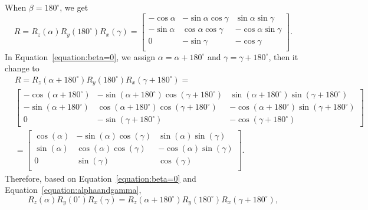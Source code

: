 When $\beta=180^{\circ}$, we get
\begin{equation}
\label{equation:beta=180}
R=R_{z}(\alpha)R_{y}(180^{\circ})R_{x}(\gamma)=
\begin{bmatrix}
-\cos\alpha&-\sin\alpha\cos\gamma&\sin\alpha\sin\gamma\\
-\sin\alpha&\cos\alpha\cos\gamma&-\cos\alpha\sin\gamma\\
0&                               -\sin\gamma&-\cos\gamma\\
\end{bmatrix}.
\end{equation}
In Equation~\ref{equation:beta=0}, we assign $\alpha=\alpha+180^{\circ}$ and $\gamma=\gamma+180^{\circ}$, then it change to
\begin{equation}
\label{equation:alphaandgamma}
\begin{aligned}
&R=R_{z}(\alpha+180^{\circ})R_{y}(180^{\circ})R_{x}(\gamma+180^{\circ})=\\
&\begin{bmatrix}
-\cos(\alpha+180^{\circ})&-\sin(\alpha+180^{\circ})\cos(\gamma+180^{\circ})&\sin(\alpha+180^{\circ})\sin(\gamma+180^{\circ})\\
-\sin(\alpha+180^{\circ})&\cos(\alpha+180^{\circ})\cos(\gamma+180^{\circ})&-\cos(\alpha+180^{\circ})\sin(\gamma+180^{\circ})\\
0&                               -\sin(\gamma+180^{\circ})&-\cos(\gamma+180^{\circ})
\end{bmatrix}\\
&=\begin{bmatrix}
\cos(\alpha)&-\sin(\alpha)\cos(\gamma)&\sin(\alpha)\sin(\gamma)\\
\sin(\alpha)&\cos(\alpha)\cos(\gamma)&-\cos(\alpha)\sin(\gamma)\\
0&                               \sin(\gamma)&\cos(\gamma)\\
\end{bmatrix}.
\end{aligned}
\end{equation}
Therefore, based on Equation~\ref{equation:beta=0} and Equation~\ref{equation:alphaandgamma},
\begin{equation}
R_{z}(\alpha)R_{y}(0^{\circ})R_{x}(\gamma)=R_{z}(\alpha+180^{\circ})R_{y}(180^{\circ})R_{x}(\gamma+180^{\circ}),
\end{equation}
